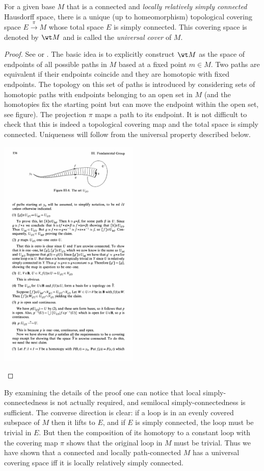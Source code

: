 \begin{thm}
For a given base $M$ that is a connected and \emph{locally relatively simply connected} Hausdorff space, there is a unique (up to homeomorphism) topological covering space $E\overset{\pi}{\to}M$ whose total space $E$ is simply connected. This covering space is denoted by $\wt M$ and is called the \emph{universal cover} of $M$.
\end{thm}
\begin{proof}
See \cite[Thm 11.43]{LeeTop} or \cite[Thm 8.4]{Bredon}. The basic idea is to explicitly construct $\wt M$ as the space of endpoints of all possible paths in $M$ based at a fixed point $m\in M$. Two paths are equivalent if their endpoints coincide and they are homotopic with fixed endpoints. The topology on this set of paths is introduced by considering sets of homotopic paths with endpoints belonging to an open set in $M$ (and the homotopies fix the starting point but can move the endpoint within the open set, see figure). The projection $\pi$ maps a path to its endpoint. It is not difficult to check that this is indeed a topological covering map and the total space is simply connected. Uniqueness will follow from the universal property described below.

\begin{center}
\includegraphics[width=0.5\textwidth]{figures/uni_open_set.pdf}
\end{center}
\end{proof}
\begin{rem}
    By examining the details of the proof one can notice that local simply-connectedness is not actually required, and semilocal simply-connectedness is sufficient. The converse direction is clear: if a loop is in an evenly covered subspace of $M$ then it lifts to $E$, and if $E$ is simply connected, the loop must be trivial in $E$. But then the composition of its homotopy to a constant loop with the covering map $\pi$ shows that the original loop in $M$ must be trivial. Thus we have shown that a connected and locally path-connected $M$ has a universal covering space iff it is locally relatively simply connected.
\end{rem}
